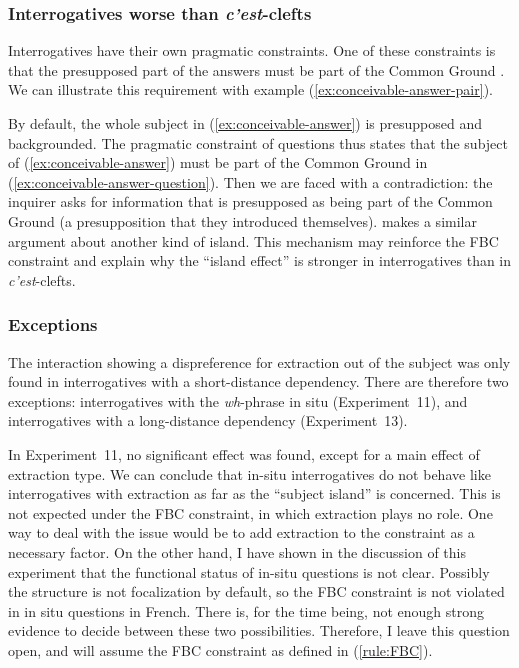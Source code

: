 \subsubsection{Interrogatives worse than \emph{c'est}-clefts}

Interrogatives have their own pragmatic constraints. One of these constraints is that the presupposed part of the answers must be part of the Common Ground \citep{Simonenko.2015}. We can illustrate this requirement with example (\ref{ex:conceivable-answer-pair}).

\eal \label{ex:conceivable-answer-pair}
\zl 

By default, the whole subject in (\ref{ex:conceivable-answer}) is presupposed and backgrounded. The pragmatic constraint of questions thus states that the subject of (\ref{ex:conceivable-answer}) must be part of the Common Ground in (\ref{ex:conceivable-answer-question}). Then we are faced with a contradiction: the inquirer asks for information that is presupposed as being part of the Common Ground (a presupposition that they introduced themselves). \citealt{Simonenko.2015} makes a similar argument about another kind of island. This mechanism may reinforce the FBC constraint and explain why the ``island effect'' is stronger in interrogatives than in \emph{c'est}-clefts.

\subsubsection{Exceptions}

The interaction showing a dispreference for extraction out of the subject was only found in interrogatives with a short-distance dependency. There are therefore two exceptions: interrogatives with the \emph{wh}-phrase in situ (Experiment~11), and interrogatives with a long-distance dependency (Experiment~13).

In Experiment~11, no significant effect was found, except for a main effect of extraction type. We can conclude that in-situ interrogatives do not behave like interrogatives with extraction as far as the ``subject island'' is concerned. This is not expected under the FBC constraint, in which extraction plays no role. One way to deal with the issue would be to add extraction to the constraint as a necessary factor. 
On the other hand, I have shown in the discussion of this experiment that the functional status of in-situ questions is not clear. Possibly the structure is not focalization by default, so the FBC constraint is not violated in in situ questions in French.
There is, for the time being, not enough strong evidence to decide between these two possibilities. Therefore, I leave this question open, and will assume the FBC constraint as defined in (\ref{rule:FBC}). 

